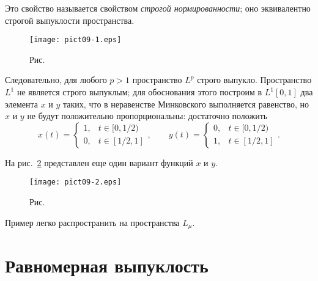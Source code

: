  Это свойство называется свойством {\it строгой
  нормированности}; оно эквивалентно строгой выпуклости пространства.

  \begin{figure}[ht]
\begin{center}
\texttt{[image: pict09-1.eps]}
\end{center}
 \bigskip
 \label{r9-1}

 \centerline{Рис.~\theris}
 \bigskip
\end{figure}


 Следовательно, для любого $p>1$ пространство ${L^p}$ строго выпукло. Пространство ${L^1}$
 не является строго выпуклым; для обоснования этого построим в ${L^1}[0,1]$
  два элемента $x$ и $y$ таких, что в неравенстве Минковского
  {выполняется равенство}, но $x$ и $y$ не будут положительно пропорциональны:
  {достаточно положить}
  $$
    {
    x(t) = \begin{cases}
      1, & t \in [0,1/2)  \\[7pt]
      0, & t \in [1/2,1]
    \end{cases},\qquad
    y(t) = \begin{cases}
      0, & t \in [0,1/2)  \\[7pt]
      1, & t \in [1/2,1]
    \end{cases}.}
  $$

 На рис.~\ref{r9-2} представлен еще один вариант функций
 $x$ и $y.$

 \bigskip
\begin{figure}[ht]
\begin{center}
\texttt{[image: pict09-2.eps]}
\end{center}
 \bigskip
 \label{r9-2}

 \centerline{Рис.~\theris}
 \bigskip
\end{figure}

 Пример легко распространить на пространства $L_{\mu}.$


 \section{Равномерная выпуклость}


